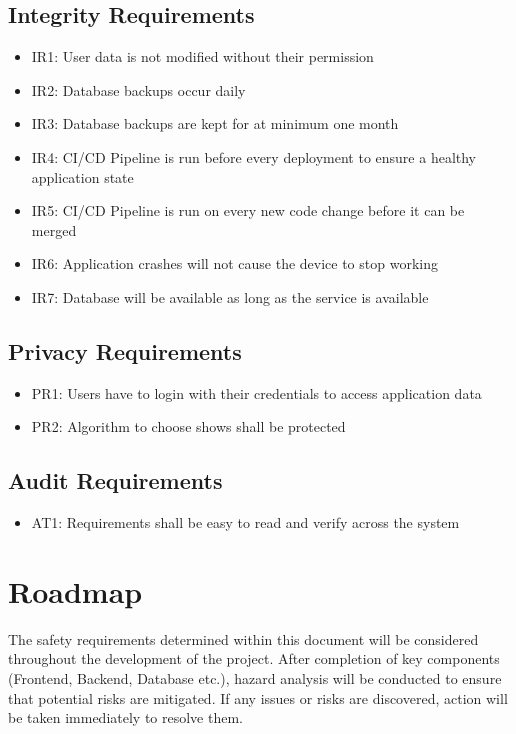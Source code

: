 \documentclass[12pt]{article}
\begin{document}
\subsection{Integrity Requirements}
\begin{itemize}
	\item IR1: User data is not modified without their permission
	\item IR2: Database backups occur daily
	\item IR3: Database backups are kept for at minimum one month
	\item IR4: CI/CD Pipeline is run before every deployment to ensure a healthy application state
	\item IR5: CI/CD Pipeline is run on every new code change before it can be merged
	\item IR6: Application crashes will not cause the device to stop working
	\item IR7: Database will be available as long as the service is available
\end{itemize}

\subsection{Privacy Requirements}
\begin{itemize}
	\item PR1: Users have to login with their credentials to access application data
	\item PR2: Algorithm to choose shows shall be protected
\end{itemize}

\subsection{Audit Requirements}
\begin{itemize}
	\item AT1: Requirements shall be easy to read and verify across the system
\end{itemize}

\section{Roadmap}
The safety requirements determined within this document will be considered throughout the development of the project. After completion of key components (Frontend, Backend, Database etc.), hazard analysis will be conducted to ensure that potential risks are mitigated. If any issues or risks are discovered, action will be taken immediately to resolve them.
\end{document}
